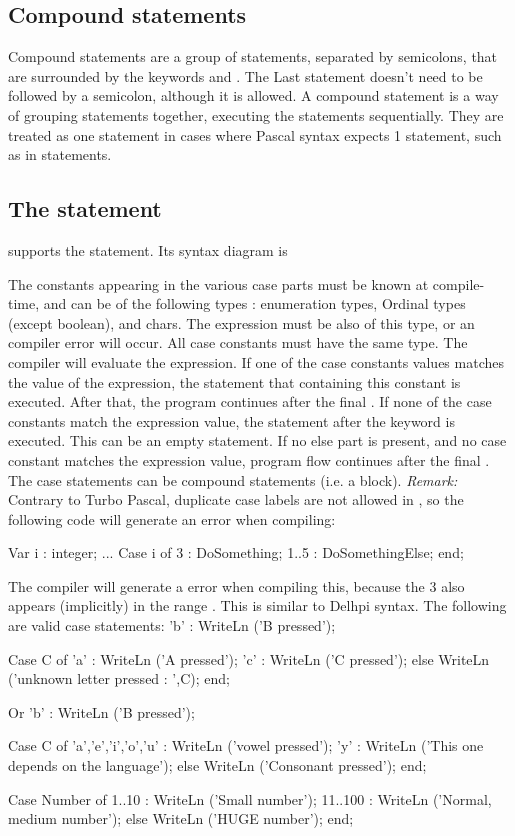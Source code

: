 \documentclass{report}
\begin{document}
\subsection{Compound statements}
Compound statements are a group of statements, separated by semicolons,
that are surrounded by the keywords  and . The
Last statement doesn't need to be followed by a semicolon, although it is
allowed. A compound statement is a way of grouping statements together, 
executing the statements sequentially. They are treated as one statement 
in cases where Pascal syntax expects 1 statement, such as in 
 statements.

\subsection{The  statement}
\fpc supports the  statement. Its syntax diagram is

The constants appearing in the various case parts must be known at 
compile-time, and can be of the following types : enumeration types, 
Ordinal types (except boolean), and chars. The expression must be also of
this type, or an compiler error will occur. All case constants must 
have the same type.
The compiler will evaluate the expression. If one of the case constants
values matches the value of the expression, the statement that containing
this constant is executed. After that, the program continues after the final
.
If none of the case constants match the expression value, the statement
after the  keyword is executed. This can be an empty statement.
If no else part is present, and no case constant matches the expression
value, program flow continues after the final .
The case statements can be compound statements 
(i.e. a  block).
{\em Remark:} Contrary to Turbo Pascal, duplicate case labels are not
allowed in \fpc, so the following code will generate an error when
compiling:
\begin{listing}
Var i : integer;
...
Case i of
 3 : DoSomething;
 1..5 : DoSomethingElse;
end;
\end{listing}
The compiler will generate a  error when compiling
this, because the 3 also appears (implicitly) in the range . This
is similar to Delhpi syntax.
The following are valid case statements:
 'b' : WriteLn ('B pressed');
\begin{listing}
Case C of 
 'a' : WriteLn ('A pressed');
 'c' : WriteLn ('C pressed');
else
  WriteLn ('unknown letter pressed : ',C);
end;
\end{listing}
Or 
 'b' : WriteLn ('B pressed');
\begin{listing}
Case C of 
 'a','e','i','o','u' : WriteLn ('vowel pressed');
 'y' : WriteLn ('This one depends on the language');
else
  WriteLn ('Consonant pressed');
end;
\end{listing}
\begin{listing}
Case Number of 
 1..10   : WriteLn ('Small number');
 11..100 : WriteLn ('Normal, medium number');
else
 WriteLn ('HUGE number');
end;
\end{listing}
\end{document}
